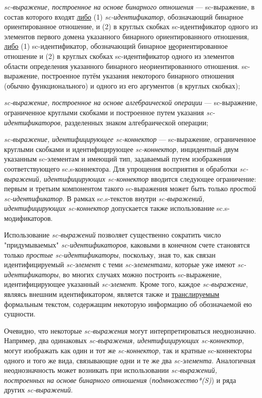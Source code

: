 \begin{textitemize}
	\item \textit{sc-выражение, построенное на основе бинарного отношения} --- sc-выражение, в состав которого входят \uline{либо} (1) \textit{sc-идентификатор}, обозначающий бинарное ориентированное отношение, и (2) в круглых скобках sc-идентификатор одного из элементов первого домена указанного бинарного ориентированного отношения, \uline{либо} (1) sc-идентификатор, обозначающий бинарное \uline{не}ориентированное отношение и (2) в круглых скобках sc-идентификатор одного из элементов области определения указанного бинарного неориентированного отношения. sc-выражение, построенное путём указания некоторого бинарного отношения (обычно функционального) и одного из его аргументов (в круглых скобках);
	\item \textit{sc-выражение, построенное на основе алгебраической операции} --- sc-выражение, ограниченное круглыми скобками и построенное путем указания \textit{sc-идентификаторов}, разделенных знаком алгебраической операции;
	\item \textit{sc-выражение, идентифицирующее sc-коннектор} --- sc-выражение, ограниченное круглыми скобками и идентифицирующее \textit{sc-коннектор}, инцидентный двум указанным sc-элементам и имеющий тип, задаваемый путем изображения соответствующего sc.s-коннектора. Для упрощения восприятия и обработки \textit{sc-выражений, идентифицирующих sc-коннектор} вводится следующее ограничение: первым и третьим компонентом такого sc-выражения может быть только \textit{простой sc-идентификатор}. В рамках sc.s-текстов внутри \textit{sc-выражений, идентифицирующих sc-коннектор} допускается также использование sc.s-модификаторов.
\end{textitemize}

Использование \textit{sc-выражений} позволяет существенно сократить число "придумываемых"{} \textit{sc-идентификаторов}, каковыми в конечном счете становятся только \textit{простые sc-идентификаторы}, поскольку, зная то, как связан идентифицируемый \textit{sc-элемент} с теми \textit{sc-элементами}, которые уже имеют \textit{sc-идентификаторы}, во многих случаях можно построить sc-выражение, идентифицирующее указанный \textit{sc-элемент}. Кроме того, каждое \textit{sc-выражение}, являясь внешним идентификатором, является также и \uline{транслируемым} формальным текстом, содержащим некоторую информацию об обозначаемой ею сущности.

Очевидно, что некоторые \textit{sc-выражения} могут интерпретироваться неоднозначно. Например, два одинаковых \textit{sc-выражения, идентифицирующих sc-коннектор}, могут изображать как один и тот же \textit{sc-коннектор}, так и кратные sc-коннекторы одного и того же вида, связывающие одни и те же два \textit{sc-элемента}. Аналогичная неоднозначность может возникать при использовании \textit{sc-выражений, построенных на основе бинарного отношения} (\textit{подмножество*(S)}) и ряда других \textit{sc-выражений}.

